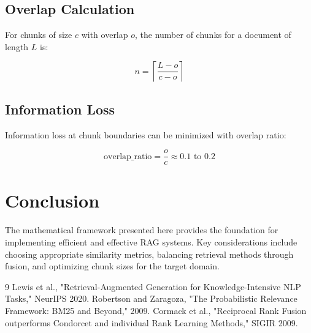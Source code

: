 \documentclass{article}
\begin{document}
\subsection{Overlap Calculation}

For chunks of size $c$ with overlap $o$, the number of chunks for a document of length $L$ is:

\begin{equation}
n = \left\lceil \frac{L - o}{c - o} \right\rceil
\end{equation}

\subsection{Information Loss}

Information loss at chunk boundaries can be minimized with overlap ratio:

\begin{equation}
\text{overlap\_ratio} = \frac{o}{c} \approx 0.1 \text{ to } 0.2
\end{equation}

\section{Conclusion}

The mathematical framework presented here provides the foundation for implementing efficient and effective RAG systems. Key considerations include choosing appropriate similarity metrics, balancing retrieval methods through fusion, and optimizing chunk sizes for the target domain.

\begin{thebibliography}{9}
 Lewis et al., "Retrieval-Augmented Generation for Knowledge-Intensive NLP Tasks," NeurIPS 2020.
 Robertson and Zaragoza, "The Probabilistic Relevance Framework: BM25 and Beyond," 2009.
 Cormack et al., "Reciprocal Rank Fusion outperforms Condorcet and individual Rank Learning Methods," SIGIR 2009.
\end{thebibliography}
\end{document}
